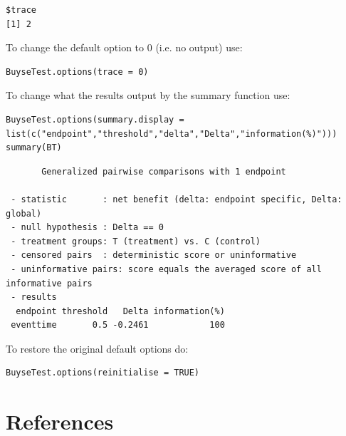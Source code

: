 \documentclass[12pt]{article}
\begin{document}
\begin{verbatim}
$trace
[1] 2
\end{verbatim}


To change the default option to 0 (i.e. no output) use:
\lstset{language=r,label= ,caption= ,captionpos=b,numbers=none}
\begin{lstlisting}
BuyseTest.options(trace = 0)
\end{lstlisting}

To change what the results output by the summary function use:
\lstset{language=r,label= ,caption= ,captionpos=b,numbers=none}
\begin{lstlisting}
BuyseTest.options(summary.display = list(c("endpoint","threshold","delta","Delta","information(%)")))
summary(BT)
\end{lstlisting}

\begin{verbatim}
       Generalized pairwise comparisons with 1 endpoint

 - statistic       : net benefit (delta: endpoint specific, Delta: global) 
 - null hypothesis : Delta == 0 
 - treatment groups: T (treatment) vs. C (control) 
 - censored pairs  : deterministic score or uninformative
 - uninformative pairs: score equals the averaged score of all informative pairs
 - results
  endpoint threshold   Delta information(%)
 eventtime       0.5 -0.2461            100
\end{verbatim}


To restore the original default options do:
\lstset{language=r,label= ,caption= ,captionpos=b,numbers=none}
\begin{lstlisting}
BuyseTest.options(reinitialise = TRUE)
\end{lstlisting}

\clearpage

\section*{References}
\label{sec:orgf87f212}
\begingroup
\renewcommand{\section}[2]{}




\endgroup
\end{document}
